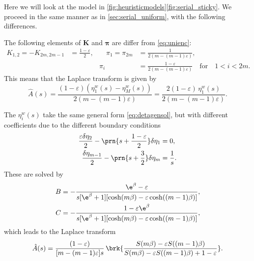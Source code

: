 \documentclass[12pt]{article}
\newcommand{\eqm}{\pi}
\newcommand{\eq}{\boldsymbol{\eqm}}
\newcommand{\etwm}{\eta^w}
\newcommand{\encm}{K}
\newcommand{\enc}{\mathbf{\encm}}
\begin{document}
Here we will look at the model in \autoref{fig:heuristicmodels}\ref{fig:serial_sticky}.
We proceed in the same manner as in \autoref{sec:serial_uniform}, with the following differences.

The following elements of $\enc$ and $\eq$ are differ from \eqref{eq:unienc}:
%
\begin{equation}\label{eq:stickyenc}
  \begin{aligned}
  \encm_{1,2} = -\encm_{2m,2m-1} &= \frac{1-\varepsilon}{2},
  &\quad
  \eqm_1 = \eqm_{2m} &= \frac{1}{2(m-(m-1)\varepsilon)},
  \\ &&
  \eqm_i &=  \frac{1-\varepsilon}{2(m-(m-1)\varepsilon)}
  \quad\text{for}\quad 1<i<2m.
  \end{aligned}
\end{equation}
%
This means that the Laplace transform is given by
%
\begin{equation}\label{eq:stickyareaeta}
  \hat{A}(s) = \frac{(1-\varepsilon)(\etwm_1(s)-\etwm_M(s))}
                    {2(m-(m-1)\varepsilon)}
       = \frac{2(1-\varepsilon)\, \etwm_1(s)}{2(m-(m-1)\varepsilon)}.
\end{equation}
%

The $\etwm_i(s)$ take the same general form \eqref{eq:detagensol}, but with different coefficients due to the different boundary conditions
%
\begin{equation}\label{eq:detabndsticky}
\begin{aligned}
  \frac{\varepsilon\delta\eta_2}{2} - \prn{s+\frac{1-\varepsilon}{2}}\delta\eta_1 &= 0, \\
  \frac{\delta\eta_{m-1}}{2} - \prn{s+\frac{3}{2}}\delta\eta_{m} &= \frac{1}{s}.
\end{aligned}
\end{equation}
%
These are solved by
%
\begin{equation}\label{eq:stickycoeffs}
\begin{aligned}
  B &= -\frac{\e^{\beta} - \varepsilon}
      {s [\e^{\beta} + 1] [\cosh(m\beta) - \varepsilon \cosh((m-1)\beta)]}, \\
  C &= -\frac{1 - \varepsilon\e^{\beta}}
      {s [\e^{\beta} + 1] [\cosh(m\beta) - \varepsilon \cosh((m-1)\beta)]},
\end{aligned}
\end{equation}
%
which leads to the Laplace transform
%
\begin{equation}\label{eq:stickylaplace}
  \hat{A}(s) = \frac{(1-\varepsilon)}{[m-(m-1)\varepsilon]s} \,
      \brk{\frac{S(m\beta) - \varepsilon S((m-1)\beta)}
      {S(m\beta) - \varepsilon S((m-1)\beta) + 1 - \varepsilon}}.
\end{equation}
%
\end{document}
